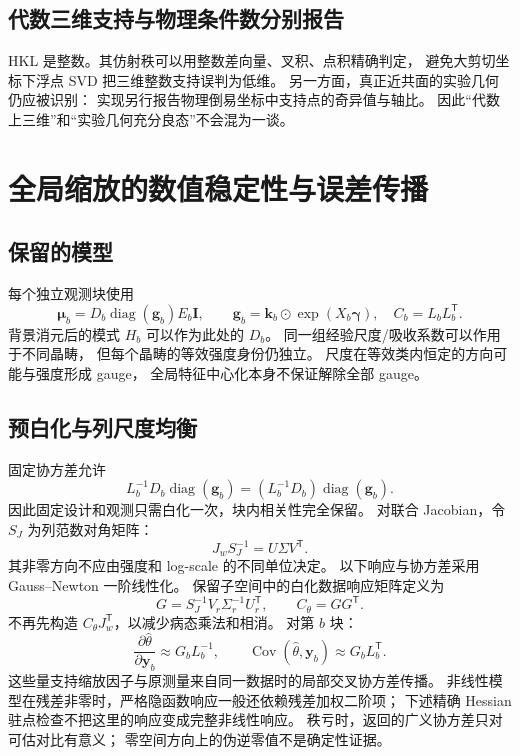 \documentclass[UTF8,11pt,a4paper,fontset=fandol]{ctexart}
\newcommand{\diag}{\operatorname{diag}}
\newcommand{\Cov}{\operatorname{Cov}}
\newcommand{\T}{^{\mathsf T}}
\begin{document}
\subsection{代数三维支持与物理条件数分别报告}

HKL 是整数。其仿射秩可以用整数差向量、叉积、点积精确判定，
避免大剪切坐标下浮点 SVD 把三维整数支持误判为低维。
另一方面，真正近共面的实验几何仍应被识别：
实现另行报告物理倒易坐标中支持点的奇异值与轴比。
因此“代数上三维”和“实验几何充分良态”不会混为一谈。

\section{全局缩放的数值稳定性与误差传播}

\subsection{保留的模型}

每个独立观测块使用
\begin{equation}
\bm\mu_b=D_b\diag(\bm g_b)E_b\bm I,\qquad
\bm g_b=\bm k_b\odot\exp(X_b\bm\gamma),
\quad C_b=L_bL_b\T.
\end{equation}
背景消元后的模式 $H_b$ 可以作为此处的 $D_b$。
同一组经验尺度/吸收系数可以作用于不同晶畴，
但每个晶畴的等效强度身份仍独立。
尺度在等效类内恒定的方向可能与强度形成 gauge，
全局特征中心化本身不保证解除全部 gauge。

\subsection{预白化与列尺度均衡}

固定协方差允许
\begin{equation}
L_b^{-1}D_b\diag(\bm g_b)
=(L_b^{-1}D_b)\diag(\bm g_b).
\end{equation}
因此固定设计和观测只需白化一次，块内相关性完全保留。
对联合 Jacobian，令 $S_J$ 为列范数对角矩阵：
\begin{equation}
J_wS_J^{-1}=U\Sigma V\T.
\end{equation}
其非零方向不应由强度和 log-scale 的不同单位决定。
以下响应与协方差采用 Gauss--Newton 一阶线性化。
保留子空间中的白化数据响应矩阵定义为
\begin{equation}
G=S_J^{-1}V_r\Sigma_r^{-1}U_r\T,\qquad
C_\theta=GG\T.
\end{equation}
不再先构造 $C_\theta J_w\T$，以减少病态乘法和相消。
对第 $b$ 块：
\begin{equation}
\frac{\partial\widehat{\theta}}{\partial \bm y_b}\approx G_bL_b^{-1},
\qquad \Cov(\widehat{\theta},\bm y_b)\approx G_bL_b\T.
\end{equation}
这些量支持缩放因子与原测量来自同一数据时的局部交叉协方差传播。
非线性模型在残差非零时，严格隐函数响应一般还依赖残差加权二阶项；
下述精确 Hessian 驻点检查不把这里的响应变成完整非线性响应。
秩亏时，返回的广义协方差只对可估对比有意义；
零空间方向上的伪逆零值不是确定性证据。
\end{document}
